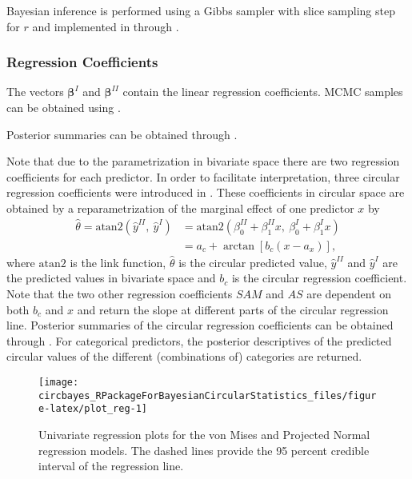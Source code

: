 Bayesian inference is performed using a Gibbs sampler with slice
sampling step for \(r\) \citep{hernandez2017general} and implemented in
 through .

\hypertarget{regression-coefficients}{%
\subsubsection{Regression Coefficients}\label{regression-coefficients}}

The vectors \(\boldsymbol{\beta}^{I}\) and \(\boldsymbol{\beta}^{II}\)
contain the linear regression coefficients. MCMC samples can be obtained
using .

Posterior summaries can be obtained through .

Note that due to the parametrization in bivariate space there are two
regression coefficients for each predictor. In order to facilitate
interpretation, three circular regression coefficients were introduced
in \citet{CremersMulderKlugkist2017}. These coefficients in circular
space are obtained by a reparametrization of the marginal effect of one
predictor \(x\) by \begin{align}
  \label{reparametrization_ch3}
  \hat{\theta} = \text{atan2}\left(\hat{y}^{II}, \:\hat{y}^{I}\right) &= \text{atan2}\left(\beta_{0}^{II} + \beta_{1}^{II} x, \: \beta_{0}^{I} + \beta_{1}^{I} x\right) \nonumber\\
  &= a_c + \arctan\left[b_{c}\left(x - a_{x}\right)\right],
\end{align} where \(\text{atan2}\) is the link function,
\(\hat{\theta}\) is the circular predicted value, \(\hat{y}^{II}\) and
\(\hat{y}^{I}\) are the predicted values in bivariate space and \(b_c\)
is the circular regression coefficient. Note that the two other
regression coefficients \(SAM\) and \(AS\) are dependent on both \(b_c\)
and \(x\) and return the slope at different parts of the circular
regression line. Posterior summaries of the circular regression
coefficients can be obtained through . For
categorical predictors, the posterior descriptives of the predicted
circular values of the different (combinations of) categories are
returned.

\begin{CodeChunk}
\begin{figure}

{\centering \texttt{[image: circbayes\_RPackageForBayesianCircularStatistics\_files/figure-latex/plot\_reg-1]} 

}

\caption[Univariate regression plots for the von Mises and Projected Normal regression models]{Univariate regression plots for the von Mises and Projected Normal regression models. The dashed lines provide the 95 percent credible interval of the regression line.}\label{fig:plot_reg}
\end{figure}
\end{CodeChunk}

